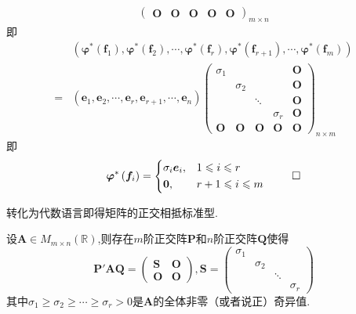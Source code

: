 \begin{formal}
\begin{Proof}
\begin{align*}
\begin{pmatrix}
                    \bm{O}&\bm{O}&\bm{O}&\bm{O}&\bm{O}
                \end{pmatrix}_{m\times n}
            \end{align*}即\begin{align*}
                &\left(
                    \bm{\varphi}^*\left(
                        \bm{f}_1
                    \right),\bm{\varphi}^*\left(
                        \bm{f}_2
                        \right)
                        ,\cdots,\bm{\varphi}^*\left(
                            \bm{f}_r
                            \right),\bm{\varphi}^*\left(
                                \bm{f}_{r+1}
                                \right),\cdots,\bm{\varphi}^*\left(
                                    \bm{f}_m
                                    \right)
                \right)\\
                =&\left(
                    \bm{e}_1,\bm{e}_2,\cdots,\bm{e}_r,\bm{e}_{r+1},\cdots,\bm{e}_n
                \right)\begin{pmatrix}
                    \sigma_1&&&&\bm{O}\\
                    &\sigma_2&&&\bm{O}\\
                    &&\ddots&&\bm{O}\\
                    &&&\sigma_r&\bm{O}\\
                    \bm{O}&\bm{O}&\bm{O}&\bm{O}&\bm{O}
                \end{pmatrix}_{n\times m}
            \end{align*}即\[
             \bm{\varphi}^*\left(
                    \bm{f}_i
                \right)=
            \begin{cases*}
                \sigma_i\bm{e}_i,&$1\leqslant i\leqslant r$\\
                \bm{0},&$r+1\leqslant i\leqslant m$
            \end{cases*}\qedhere
            \]
    \end{Proof}
\end{formal}
转化为代数语言即得矩阵的正交相抵标准型.

\begin{formal}
    \begin{theorem}[正交相抵标准型]\label{thm:正交相抵标准型}
        设$\bm{A}\in M_{m\times n}\left(\mathbb{R}\right)$,则存在$m$阶正交阵$\bm{P}$和$n$阶正交阵$\bm{Q}$使得\[
        \bm{P}'\bm{AQ}=\begin{pmatrix}
            \bm{S}&\bm{O}\\
            \bm{O}&\bm{O}
        \end{pmatrix},\bm{S}=\begin{pmatrix}
            \sigma_1&&&\\
            &\sigma_2&&\\
            &&\ddots&\\
            &&&\sigma_r
        \end{pmatrix}
        \]其中$\sigma_1\geqslant\sigma_2\geqslant\cdots\geqslant\sigma_r>0$是$\bm{A}$的全体非零（或者说正）奇异值.
    \end{theorem}
\end{formal}
